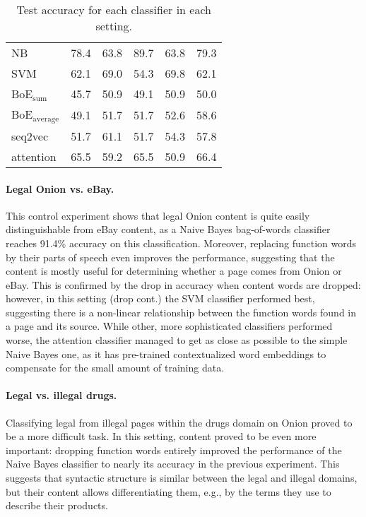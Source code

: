 \documentclass[11pt,a4paper,table]{article}
\begin{document}
\begin{table}[t]
\begin{tabular}{l *{5}{R}}
\hline
NB & 78.4 & 63.8 & 89.7 & 63.8 & 79.3\\
SVM & 62.1 & 69.0 & 54.3 & 69.8 & 62.1\\
BoE$_\mathrm{sum}$ & 45.7 & 50.9 & 49.1 & 50.9 & 50.0\\
BoE$_\mathrm{average}$ & 49.1 & 51.7 & 51.7 & 52.6 & 58.6\\
seq2vec & 51.7 & 61.1 & 51.7 & 54.3 & 57.8\\
attention & 65.5 & 59.2 & 65.5 & 50.9 & 66.4\\
\end{tabular}
\caption{Test accuracy for each classifier in each setting.
\label{tab:results}}
\end{table}


\paragraph{Legal Onion vs. eBay.}

This control experiment shows that legal Onion content is quite easily
distinguishable from eBay content, as a Naive Bayes bag-of-words classifier
reaches 91.4\% accuracy on this classification.
Moreover, replacing function words by their parts of speech even improves
the performance, suggesting that the content is mostly useful for determining
whether a page comes from Onion or eBay.
This is confirmed by the drop in accuracy when content words are dropped:
however, in this setting (drop cont.) the SVM classifier performed best,
suggesting there is a non-linear relationship between the function words
found in a page and its source.
While other, more sophisticated classifiers performed worse, the attention
classifier managed to get as close as possible to the simple Naive Bayes
one, as it has pre-trained contextualized word embeddings to compensate for
the small amount of training data.

\paragraph{Legal vs. illegal drugs.}

Classifying legal from illegal pages within the drugs domain on Onion
proved to be a more difficult task.
In this setting, content proved to be even more important:
dropping function words entirely improved the performance of the Naive Bayes
classifier to nearly its accuracy in the previous experiment.
This suggests that syntactic structure is similar between the legal and illegal
domains, but their content allows differentiating them, e.g.,
by the terms they use to describe their products.
\end{document}
